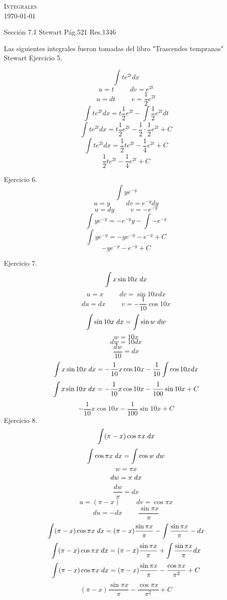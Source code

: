 \documentclass{amsart}
\begin{document}
    \begin{center}
        \textsc{ Integrales} \\
        \today
    \end{center}
    \begin{flushleft}
        Sección 7.1 Stewart Pág.521 Res.1346
    \end{flushleft}
    Las siguientes integrales fueron tomadas del libro "Trascendes tempranas" Stewart
    Ejercicio 5.
    
    \[\int te^{2t} dx\]
    \[ u = t \hspace{1cm} dv=e^{2t}\]
    \[ u = dt \hspace{1cm} v = \frac{1}{2}e^{2t}\]
    \[\int te^{2t} dx = t\frac{1}{2}e^{2t} - \int \frac{1}{2}e^{2t} dt\]
    \[\int te^{2t} dx = t\frac{1}{2}e^{2t} - \frac{1}{2}\cdot\frac{1}{2}e^{2t} + C\]
    \[\int te^{2t} dx = \frac{1}{2}te^{2t} - \frac{1}{4}e^{2t} + C\]
    \[\frac{1}{2}te^{2t} - \frac{1}{4}e^{2t} + C\]
    
    Ejercicio 6.
    \[\int ye^{-y}\]
    \[u = y \hspace{1cm} dv = e^{-y} dy\]
    \[u = dy \hspace{1cm} v = -e^{-y}\]
    \[\int ye^{-y} = -e^{-y}y - \int -e^{-y}\]
    \[\int ye^{-y} = -ye^{-y} -e^{-y} + C\]
    \[-ye^{-y} -e^{-y} + C\]
    
    Ejercicio 7.
    \[\int x\sin{10x} \hspace{1mm} dx\]
    \[ u = x \hspace{1cm} dv = \sin{10x} dx\]
    \[ du = dx \hspace{1cm} v = -\frac{1}{10}\cos{10x}\]
    \[\int \sin{10x} \hspace{1mm} dx = \int \sin{w} \hspace{1mm} dw\]
    \[w = 10x\]
    \[dw = 10 dx\]
    \[\frac{dw}{10} = dx\]
    \[\int x\sin{10x} \hspace{1mm} dx = -\frac{1}{10}x\cos{10x} - \frac{1}{10}\int \cos{10x} dx\]
    \[\int x\sin{10x} \hspace{1mm} dx = -\frac{1}{10}x\cos{10x} - \frac{1}{100}\sin{10x} + C\]
    \[-\frac{1}{10}x\cos{10x} - \frac{1}{100}\sin{10x} + C\]
    Ejercicio 8.
    \[\int(\pi - x)\cos{\pi x} \hspace{1mm} dx\]
    \[\int \cos{\pi x} \hspace{1mm} dx = \int \cos{w} \hspace{1mm} dw\]
    \[ w = \pi x \]
    \[ dw = \pi \hspace{1mm} dx\]
    \[\frac{dw}{\pi} = dx\]
    \[ u = (\pi -x) \hspace{1cm} dv = \cos{\pi x}\]
    \[ du = -dx \hspace{1cm} \frac{\sin{\pi x}}{\pi}\]
    \[\int(\pi - x)\cos{\pi x} \hspace{1mm} dx = (\pi - x)\frac{\sin{\pi x}}{\pi} - \int \frac{\sin{\pi x}}{\pi} -dx\]
    \[\int(\pi - x)\cos{\pi x} \hspace{1mm} dx = (\pi - x)\frac{\sin{\pi x}}{\pi} + \int \frac{\sin{\pi x}}{\pi} dx\]
    \[\int(\pi - x)\cos{\pi x} \hspace{1mm} dx = (\pi - x)\frac{\sin{\pi x}}{\pi} - \frac{\cos{\pi x}}{\pi^{2}} + C\]
    \[(\pi - x)\frac{\sin{\pi x}}{\pi} - \frac{\cos{\pi x}}{\pi^{2}} + C\]
\end{document}
